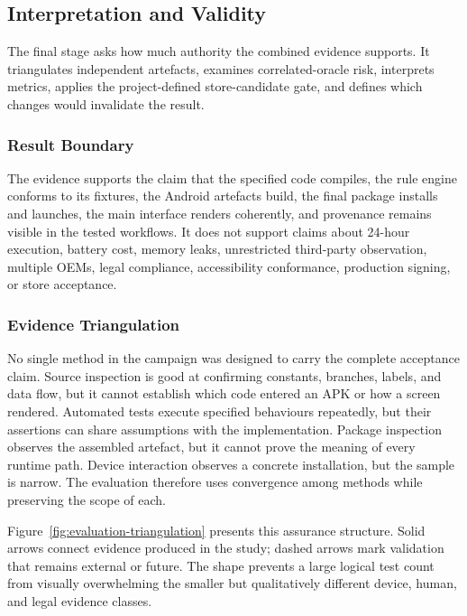 \subsection{Interpretation and Validity}

The final stage asks how much authority the combined evidence supports. It triangulates independent artefacts, examines correlated-oracle risk, interprets metrics, applies the project-defined store-candidate gate, and defines which changes would invalidate the result.

\subsubsection{Result Boundary}

The evidence supports the claim that the specified code compiles, the rule engine conforms to its fixtures, the Android artefacts build, the final package installs and launches, the main interface renders coherently, and provenance remains visible in the tested workflows. It does not support claims about 24-hour execution, battery cost, memory leaks, unrestricted third-party observation, multiple OEMs, legal compliance, accessibility conformance, production signing, or store acceptance.

\subsubsection{Evidence Triangulation}

No single method in the campaign was designed to carry the complete acceptance claim. Source inspection is good at confirming constants, branches, labels, and data flow, but it cannot establish which code entered an APK or how a screen rendered. Automated tests execute specified behaviours repeatedly, but their assertions can share assumptions with the implementation. Package inspection observes the assembled artefact, but it cannot prove the meaning of every runtime path. Device interaction observes a concrete installation, but the sample is narrow. The evaluation therefore uses convergence among methods while preserving the scope of each.

Figure~\ref{fig:evaluation-triangulation} presents this assurance structure. Solid arrows connect evidence produced in the study; dashed arrows mark validation that remains external or future. The shape prevents a large logical test count from visually overwhelming the smaller but qualitatively different device, human, and legal evidence classes.

